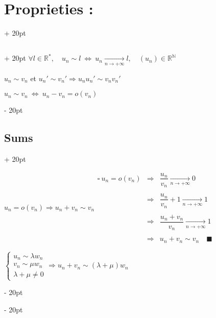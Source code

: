 \documentclass[a4paper, 12pt, twoside]{article}
\newcommand{\N}{\mathbb{N}} %
\newcommand{\R}{\mathbb{R}} %
\newcommand{\tendsto}[1]{\xrightarrow[#1]{}}
\newcommand{\ssi}{\ \Leftrightarrow \ }
\newcommand{\ind}[1][20pt]{\advance\leftskip + #1}
\newcommand{\deind}[1][20pt]{\advance\leftskip - #1}
\newenvironment{indentedenv}[1][20pt]{\par \ind[#1]}{\par \deind}
\newenvironment{indt}[2][20pt]{#2 \begin{indentedenv}[#1]}{\end{indentedenv}} %
\begin{document}
    \begin{indt}{\section{Proprieties :}}
        
        \begin{indt}{\subsection{}}
            $\forall l \in \R^*,\quad u_n \sim l \ssi u_n \tendsto{n \to +\infty} l, \quad (u_n) \in \R^\N$
            
            \vspace{6pt}
            
            $u_n \sim v_n$ et $u_n' \sim v_n' \Rightarrow u_n u_n' \sim v_n v_n'$
            
            \vspace{6pt}
            
            $u_n \sim v_n \ssi u_n - v_n = o(v_n)$
        \end{indt}
        
        \begin{indt}{\subsection{Sums}}
            
            $u_n = o(v_n) \Rightarrow u_n + v_n \sim v_n
            \begin{array}{rcl}
                \square\
                u_n = o(v_n)
                &\Rightarrow& \dfrac{u_n}{v_n} \tendsto{n \to +\infty} 0
                \\\\
                &\Rightarrow& \dfrac{u_n}{v_n} + 1 \tendsto{n \to +\infty} 1
                \\\\
                &\Rightarrow& \dfrac{u_n + v_n}{v_n} \tendsto{n \to +\infty} 1
                \\\\
                &\Rightarrow& u_n + v_n \sim v_n
                \quad \blacksquare
            \end{array}$
            
            \vspace{12pt}
            
            $\begin{cases}
                u_n \sim \lambda w_n
                \\
                v_n \sim \mu w_n
                \\
                \lambda + \mu \neq 0
            \end{cases}
            \Rightarrow
            u_n + v_n \sim (\lambda + \mu)w_n
            $
            

\end{indt}
\end{indt}
\end{document}

